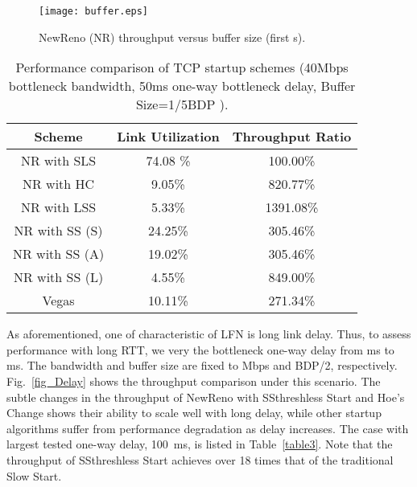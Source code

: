 \documentclass[12pt,onecolumn]{IEEEtran}
\begin{document}
\begin{figure}
\centering
\texttt{[image: buffer.eps]}
\caption{NewReno (NR) throughput versus buffer size (first s).} \label{fig_Buffer}
\end{figure}
\begin{table}[h]
\centering
\caption{\footnotesize  Performance comparison of TCP startup schemes (40Mbps bottleneck bandwidth, 50ms one-way bottleneck delay, Buffer Size=1/5BDP ).}
\begin{tabular}{|c|c|c|} \hline
Scheme & Link Utilization & Throughput Ratio\\ \hline \hline
NR with SLS & 74.08 \%  &   100.00\% \\ \hline NR with HC & 9.05\%  &   820.77\%  \\ \hline
NR with LSS & 5.33\%  &   1391.08\% \\ \hline
NR with SS (S) &   24.25\% & 305.46\% \\ \hline
NR with SS (A) &   19.02\% & 305.46\% \\ \hline
NR with SS (L) & 4.55\%  &   849.00\% \\ \hline
Vegas & 10.11\%  &   271.34\% \\ \hline
\end{tabular}
\label{table4}
\end{table}


As aforementioned, one of characteristic of LFN is long link delay. Thus, to
assess performance with long RTT, we very the bottleneck one-way delay from
 ms to  ms. The bandwidth and buffer size are fixed to  Mbps and
BDP/2, respectively. Fig.~\ref{fig_Delay} shows the throughput comparison under
this scenario. The subtle changes in the throughput of NewReno with
SSthreshless Start and Hoe's Change shows their ability to scale well with long
delay, while other startup algorithms suffer from performance degradation as
delay increases. The case with largest tested one-way delay, 100~ms, is listed
in Table~\ref{table3}. Note that the throughput of SSthreshless Start achieves
over 18 times that of the traditional Slow Start.
\end{document}
